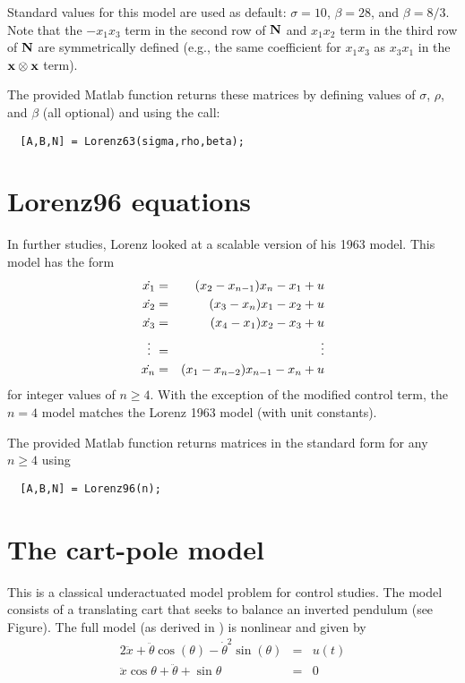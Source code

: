 \documentclass[11pt, oneside]{article}   	%
\begin{document}
Standard values for this model are used as default: $\sigma=10$, $\beta=28$, and $\beta=8/3$.  Note that the
$-x_1x_3$ term in the second row of ${\bf N}$ and $x_1x_2$ term in the third row of ${\bf N}$ are symmetrically
defined (e.g., the same coefficient for $x_1x_3$ as $x_3x_1$ in the ${\bf x}\otimes{\bf x}$ term).

The provided Matlab function returns these matrices by defining values of $\sigma$, $\rho$, and $\beta$ (all optional) and using the call:

\begin{verbatim}
  [A,B,N] = Lorenz63(sigma,rho,beta);
\end{verbatim}

\section{Lorenz96 equations}

In further studies, Lorenz looked at a scalable version of his 1963 model.  This model has the form
%
\begin{eqnarray*}
  \dot{x_1} &=& (x_2-x_{n-1})x_n     - x_1 + u\\
  \dot{x_2} &=& (x_3-x_{n  })x_1     - x_2 + u\\
  \dot{x_3} &=& (x_4-x_1    )x_2     - x_3 + u \\
    \vdots\hspace{.05in}  &=& \hspace{0.5in}  \vdots\\
  \dot{x_n} &=& (x_1-x_{n-2})x_{n-1} - x_n + u\\
\end{eqnarray*}
%
for integer values of $n\geq 4$.  With the exception of the modified control term, the $n=4$ model matches
the Lorenz 1963 model (with unit constants).

The provided Matlab function returns matrices in the standard form for any $n\geq 4$ using
%
\begin{verbatim} 
  [A,B,N] = Lorenz96(n);
\end{verbatim}

\section{The cart-pole model}

This is a classical underactuated model problem for control studies.  The model consists of a translating cart
that seeks to balance an inverted pendulum (see Figure).  The full model (as derived in
\cite{florian2007correct}) is nonlinear and given by
%
\begin{eqnarray*}
   2\ddot{x} + \ddot{\theta}\cos(\theta) - \dot{\theta}^2\sin(\theta) &=& u(t) \\
   \ddot{x}\cos{\theta} + \ddot{\theta} + \sin{\theta}                &=& 0
\end{eqnarray*}
\end{document}
